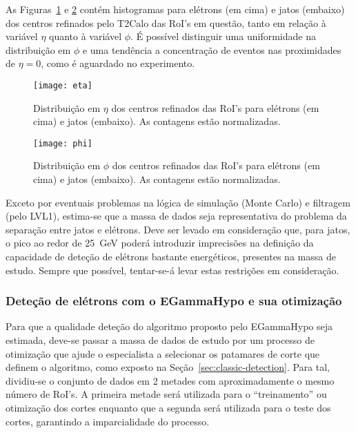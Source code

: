 As Figuras~\ref{fig:eta} e \ref{fig:phi} contém histogramas para elétrons (em
cima) e jatos (embaixo) dos centros refinados pelo T2Calo das RoI's em
questão, tanto em relação à variável $\eta$ quanto à variável $\phi$. É
possível distinguir uma uniformidade na distribuição em $\phi$ e uma tendência
a concentração de eventos nas proximidades de $\eta=0$, como é aguardado no
experimento.

\begin{figure}
\begin{center}
\texttt{[image: eta]}
\end{center}
\caption{Distribuição em $\eta$ dos centros refinados das RoI's para elétrons
(em cima) e jatos (embaixo). As contagens estão normalizadas.}
\label{fig:eta}
\end{figure}

\begin{figure}
\begin{center}
\texttt{[image: phi]}
\end{center}
\caption{Distribuição em $\phi$ dos centros refinados das RoI's para elétrons
(em cima) e jatos (embaixo). As contagens estão normalizadas.}
\label{fig:phi}
\end{figure}

Exceto por eventuais problemas na lógica de simulação (Monte Carlo) e
filtragem (pelo LVL1), estima-se que a massa de dados seja representativa do
problema da separação entre jatos e elétrons. Deve ser levado em consideração
que, para jatos, o pico ao redor de 25~GeV poderá introduzir imprecisões na
definição da capacidade de deteção de elétrons bastante energéticos, presentes
na massa de estudo. Sempre que possível, tentar-se-á levar estas restrições em
consideração.

\subsubsection{Deteção de elétrons com o EGammaHypo e sua otimização}
\label{sec:eghypo}

Para que a qualidade deteção do algoritmo proposto pelo EGammaHypo seja
estimada, deve-se passar a massa de dados de estudo por um processo de
otimização que ajude o especialista a selecionar os patamares de corte que
definem o algoritmo, como exposto na Seção~\ref{sec:classic-detection}. Para
tal, dividiu-se o conjunto de dados em 2 metades com aproximadamente o mesmo
número de RoI's. A primeira metade será utilizada para o ``treinamento'' ou
otimização dos cortes enquanto que a segunda será utilizada para o teste dos
cortes, garantindo a imparcialidade do processo.

